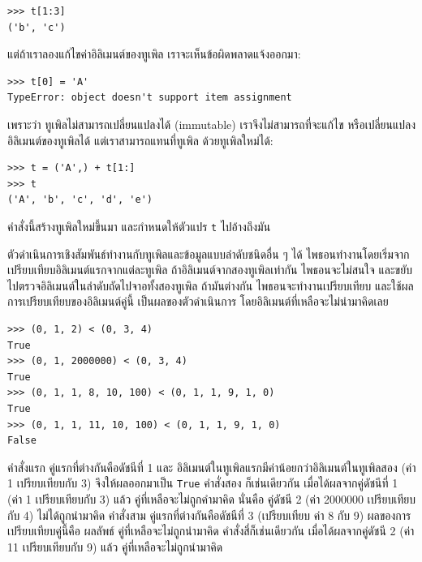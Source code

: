 \begin{verbatim}
>>> t[1:3]
('b', 'c')
\end{verbatim}
%
%
แต่ถ้าเราลองแก้ไขค่าอิลิเมนต์ของทูเพิล เราจะเห็นข้อผิดพลาดแจ้งออกมา:


\begin{verbatim}
>>> t[0] = 'A'
TypeError: object doesn't support item assignment
\end{verbatim}
%
%
เพราะว่า ทูเพิลไม่สามารถเปลี่ยนแปลงได้ (immutable)
เราจึงไม่สามารถที่จะแก้ไข หรือเปลี่ยนแปลงอิลิเมนต์ของทูเพิลได้
แต่เราสามารถแทนที่ทูเพิล ด้วยทูเพิลใหม่ได้:

\begin{verbatim}
>>> t = ('A',) + t[1:]
>>> t
('A', 'b', 'c', 'd', 'e')
\end{verbatim}
%
คำสั่งนี้สร้างทูเพิลใหม่ขึ้นมา
และกำหนดให้ตัวแปร \texttt{t} ไปอ้างถึงมัน


ตัวดำเนินการเชิงสัมพันธ์ทำงานกับทูเพิลและข้อมูลแบบลำดับชนิดอื่น ๆ ได้
ไพธอนทำงานโดยเริ่มจากเปรียบเทียบอิลิเมนต์แรกจากแต่ละทูเพิล
ถ้าอิลิเมนต์จากสองทูเพิลเท่ากัน ไพธอนจะไม่สนใจ
และขยับไปตรวจอิลิเมนต์ในลำดับถัดไปจาอทั้งสองทูเพิล
ถ้ามันต่างกัน ไพธอนจะทำงานเปรียบเทียบ 
และใช้ผลการเปรียบเทียบของอิลิเมนต์คู่นี้ เป็นผลของตัวดำเนินการ
โดยอิลิเมนต์ที่เหลือจะไม่นำมาคิดเลย
%

\begin{verbatim}
>>> (0, 1, 2) < (0, 3, 4)
True
>>> (0, 1, 2000000) < (0, 3, 4)
True
>>> (0, 1, 1, 8, 10, 100) < (0, 1, 1, 9, 1, 0)
True
>>> (0, 1, 1, 11, 10, 100) < (0, 1, 1, 9, 1, 0)
False
\end{verbatim}
%
คำสั่งแรก คู่แรกที่ต่างกันคือดัชนีที่ 1 และ
อิลิเมนต์ในทูเพิลแรกมีค่าน้อยกว่าอิลิเมนต์ในทูเพิลสอง (ค่า 1 เปรียบเทียบกับ 3) 
จึงให้ผลออกมาเป็น \texttt{True}
คำสั่งสอง ก็เช่นเดียวกัน เมื่อได้ผลจากคู่ดัชนีที่ 1 (ค่า 1 เปรียบเทียบกับ 3) แล้ว
คู่ที่เหลือจะไม่ถูกคำมาคิด 
นั่นคือ คู่ดัชนี 2 (ค่า 2000000 เปรียบเทียบกับ 4) ไม่ได้ถูกนำมาคิด
คำสั่งสาม คู่แรกที่ต่างกันคือดัชนีที่ 3 (เปรียบเทียบ ค่า 8 กับ 9)
ผลของการเปรียบเทียบคู่นี้คือ ผลลัพธ์
คู่ที่เหลือจะไม่ถูกนำมาคิด
คำสั่งสี่ก็เช่นเดียวกัน เมื่อได้ผลจากคู่ดัชนี 2 (ค่า 11 เปรียบเทียบกับ 9) แล้ว
คู่ที่เหลือจะไม่ถูกนำมาคิด

